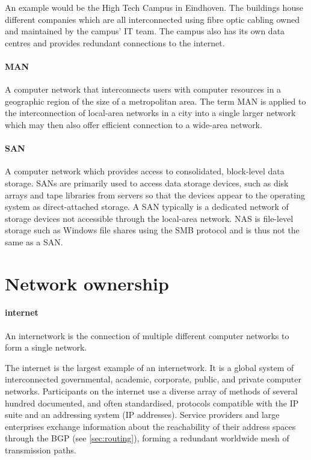 {An example would be the High Tech Campus in Eindhoven.
The buildings house different companies which are all interconnected using fibre optic cabling owned and maintained by the campus' \acs{IT} team.
The campus also has its own data centres and provides redundant connections to the internet.

\paragraph{\gls{MAN}}%
A computer network that interconnects users with computer resources in a geographic region of the size of a metropolitan area.
The term \gls{MAN} is applied to the interconnection of local-area networks in a city into a single larger network which may then also offer efficient connection to a wide-area network.

\paragraph{\gls{SAN}}%
A computer network which provides access to consolidated, block-level data storage.
\glspl{SAN} are primarily used to access data storage devices, such as disk arrays and tape libraries from servers so that the devices appear to the operating system as direct-attached storage.
A \gls{SAN} typically is a dedicated network of storage devices not accessible through the local-area network.
\Gls{NAS} is file-level storage such as Windows file shares using the \acs{SMB} protocol and is thus not the same as a \acs{SAN}.




\section{Network ownership}
\label{sec:network-ownership}

\paragraph{internet}%
An internetwork is the connection of multiple different computer networks to form a single network.

The internet is the largest example of an internetwork.
It is a global system of interconnected governmental, academic, corporate, public, and private computer networks.
Participants on the internet use a diverse array of methods of several hundred documented, and often standardised, protocols compatible with the \acl{IP} suite and an addressing system (\acs{IP} addresses).
Service providers and large enterprises exchange information about the reachability of their address spaces through the \acf{BGP} (see \vref{sec:routing}), forming a redundant worldwide mesh of transmission paths.

}
